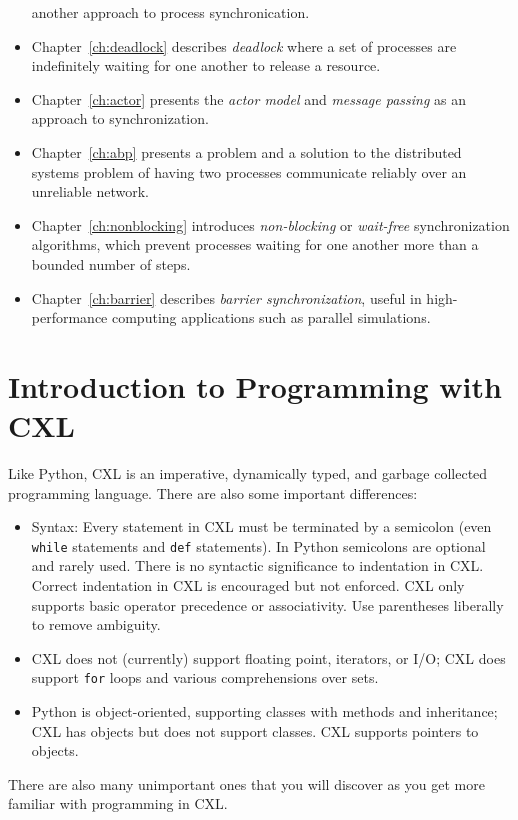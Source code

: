 \documentclass{report}
\begin{document}
\begin{itemize}
another approach to process synchronication.
\item Chapter~\ref{ch:deadlock} describes \emph{deadlock}
where a set of processes are indefinitely waiting for one another to
release a resource.
\item Chapter~\ref{ch:actor} presents the \emph{actor model}
and \emph{message passing} as an approach to synchronization.
\item Chapter~\ref{ch:abp} presents a problem and a solution to the distributed
systems problem of having two processes communicate reliably over an unreliable
network.
\item Chapter~\ref{ch:nonblocking} introduces \emph{non-blocking} or
\emph{wait-free} synchronization algorithms,
which prevent processes waiting for one another more than a bounded number of
steps.
\item Chapter~\ref{ch:barrier} describes \emph{barrier synchronization},
useful in high-performance computing applications such as parallel simulations.
\end{itemize}

\chapter{Introduction to Programming with CXL}
\label{ch:cxlintro}

Like Python, CXL is an imperative,
dynamically typed, and garbage collected programming language.
There are also some important differences:
\begin{itemize}
\item Syntax: Every statement in CXL must be terminated by a semicolon
(even \texttt{while} statements and \texttt{def} statements).
In Python semicolons are optional and rarely used.
There is no syntactic significance to indentation in CXL.
Correct indentation in CXL is encouraged but not enforced.
CXL only supports basic operator precedence or associativity.
Use parentheses liberally to remove ambiguity.
\item CXL does not (currently) support floating point, iterators, or I/O;
CXL does support \texttt{for} loops and various comprehensions over sets.
\item Python is object-oriented, supporting classes with methods and
inheritance; CXL has objects but does not support classes.  CXL supports
pointers to objects.
\end{itemize}
There are also many unimportant ones that you will discover as
you get more familiar with programming in CXL.
\end{document}

